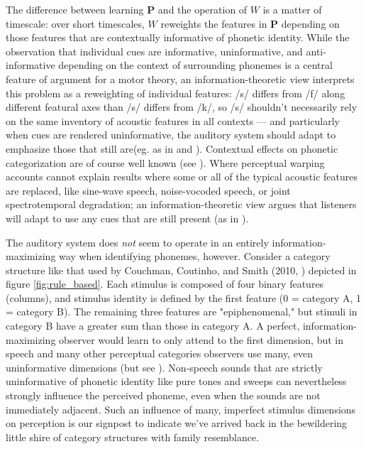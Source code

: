 The difference between learning $\mathbf{P}$ and the operation of $W$ is a matter of timescale: over short timescales, $W$ reweights the features in $\mathbf{P}$ depending on those features that are contextually informative of phonetic identity. While the observation that individual cues are informative, uninformative, and anti-informative depending on the context of surrounding phonemes is a central feature of argument for a motor theory\citep{Bailey1980}, an information-theoretic view interprets this problem as a reweighting of individual features: /s/ differs from /f/ along different featural axes than /s/ differs from /k/, so /s/ shouldn't necessarily rely on the same inventory of acoustic features in all contexts --- and particularly when cues are rendered uninformative, the auditory system should adapt to emphasize those that still are(eg. as in \citep{kiefteAbsorptionReliableSpectral2008} and \citep{kleinschmidtRobustSpeechPerception2015a}). Contextual effects on phonetic categorization are of course well known (see \citep{holtSpeechPerceptionCategorization2010a}). Where perceptual warping accounts cannot explain results where some or all of the typical acoustic features are replaced, like sine-wave speech\citep{remezSpeechPerceptionTraditional1981}, noise-vocoded speech\citep{davisLexicalInformationDrives2005}, or joint spectrotemporal degradation\citep{elliottModulationTransferFunction2009a}; an information-theoretic view argues that listeners will adapt to use any cues that are still present (as in \citep{kiefteAbsorptionReliableSpectral2008}). 

The auditory system does \textit{not} seem to operate in an entirely information-maximizing way when identifying phonemes, however. Consider a category structure like that used by Couchman, Coutinho, and Smith (2010, \citep{couchmanRulesResemblanceTheir2010}) depicted in figure \ref{fig:rule_based}. Each stimulus is composed of four binary features (columns), and stimulus identity is defined by the first feature (0 = category A, 1 = category B). The remaining three features are "epiphenomenal," but stimuli in category B have a greater sum than those in category A. A perfect, information-maximizing observer would learn to only attend to the first dimension, but in speech and many other perceptual categories observers use many, even uninformative dimensions\citep{couchmanRulesResemblanceTheir2010,roschFamilyResemblancesStudies1975} (but see \citep{leaUseMultipleDimensions2008}). Non-speech sounds that are strictly uninformative of phonetic identity like pure tones and sweeps can nevertheless strongly influence the perceived phoneme\citep{holtNeighboringSpectralContent2000,holtMeanMattersEffects2006}, even when the sounds are not immediately adjacent\citep{holtTemporallyNonadjacentNonlinguistic2005}. Such an influence of many, imperfect stimulus dimensions on perception is our signpost to indicate we've arrived back in the bewildering little shire of category structures with family resemblance.

